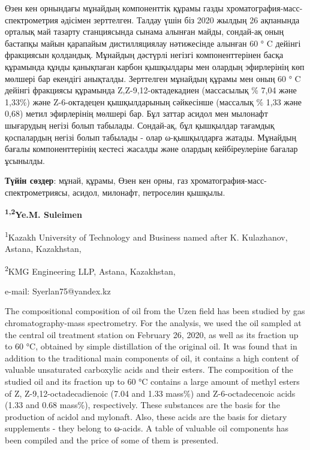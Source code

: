 Өзен кен орнындағы мұнайдың компоненттік құрамы газды
хроматография-масс-спектрометрия әдісімен зерттелген. Талдау үшін біз
2020 жылдың 26 ақпанында орталық май тазарту станциясында сынама алынған
майды, сондай-ақ оның бастапқы майын қарапайым дистилляциялау
нәтижесінде алынған 60 ° C дейінгі фракциясын қолдандық. Мұнайдың
дәстүрлі негізгі компоненттерінен басқа құрамында құнды қанықпаған
карбон қышқылдары мен олардың эфирлерінің көп мөлшері бар екендігі
анықталды. Зерттелген мұнайдың құрамы мен оның 60 ° C дейінгі фракциясы
құрамында Z,Z-9,12-октадекадиен (массасылық \% 7,04 және 1,33\%) және
Z-6-октадецен қышқылдарының сәйкесінше (массалық \% 1,33 және 0,68)
метил эфирлерінің мөлшері бар. Бұл заттар асидол мен мылонафт шығарудың
негізі болып табылады. Сондай-ақ, бұл қышқылдар тағамдық қоспалардың
негізі болып табылады - олар ω-қышқылдарға жатады. Мұнайдың бағалы
компоненттерінің кестесі жасалды және олардың кейбіреулеріне бағалар
ұсынылды.

{\bfseries Түйін сөздер}: мұнай, құрамы, Өзен кен орны, газ
хроматография-масс-спектрометриясы, асидол, милонафт, петроселин
қышқылы.


\begin{center}
{\bfseries \textsuperscript{1,2}Ye.M. Suleimen}

\textsuperscript{1}Kazakh University of Technology and Business named
after K. Kulazhanov, Astana, Kazakhstan,

\textsuperscript{2}KMG Engineering LLP, Astana, Kazakhstan,

e-mail: Syerlan75@yandex.kz
\end{center}

The compositional composition of oil from the Uzen field has been
studied by gas chromatography-mass spectrometry. For the analysis, we
used the oil sampled at the central oil treatment station on February
26, 2020, as well as its fraction up to 60 °C, obtained by simple
distillation of the original oil. It was found that in addition to the
traditional main components of oil, it contains a high content of
valuable unsaturated carboxylic acids and their esters. The composition
of the studied oil and its fraction up to 60 °C contains a large amount
of methyl esters of Z, Z-9,12-octadecadienoic (7.04 and 1.33 mass\%) and
Z-6-octadecenoic acids (1.33 and 0.68 mass\%), respectively. These
substances are the basis for the production of acidol and mylonaft.
Also, these acids are the basis for dietary supplements - they belong to
ω-acids. A table of valuable oil components has been compiled and the
price of some of them is presented.

